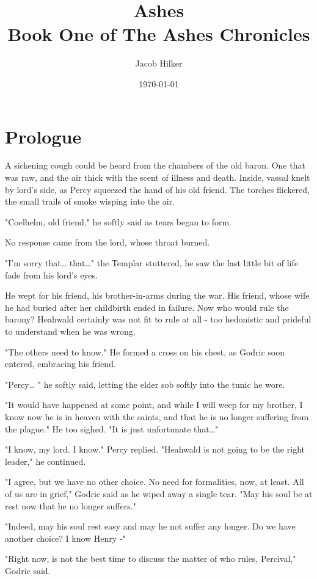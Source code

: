 \documentclass{book}
\author{Jacob Hilker}
\date{\today}
\title{Ashes\\\medskip
\large Book One of The Ashes Chronicles}
\begin{document}
\maketitle
\tableofcontents

\chapter*{Prologue}
\label{sec:org91c2b69}
A sickening cough could be heard from the chambers of the old baron. One that was raw, and the air thick with the scent of illness and death. Inside, vassal knelt by lord's side, as Percy squeezed the hand of his old friend. The torches flickered, the small trails of smoke wisping into the air.

"Coelhelm, old friend," he softly said as tears began to form.

No response came from the lord, whose throat burned.

"I'm sorry that… that…" the Templar stuttered, he saw the last little bit of life fade from his lord's eyes.

He wept for his friend, his brother-in-arms during the war. His friend, whose wife he had buried after her childbirth ended in failure. Now who would rule the barony? Heahwald certainly was not fit to rule at all - too hedonistic and prideful to understand when he was wrong.

"The others need to know." He formed a cross on his chest, as Godric soon entered, embracing his friend.

"Percy\ldots{} " he softly said, letting the elder sob softly into the tunic he wore.

"It would have happened at some point, and while I will weep for my brother, I know now he is in heaven with the saints, and that he is no longer suffering from the plague." He too sighed. "It is just unfortunate that…"

"I know, my lord. I know." Percy replied. "Heahwald is not going to be the right leader," he continued.

"I agree, but we have no other choice. No need for formalities, now, at least. All of us are in grief," Godric said as he wiped away a single tear. "May his soul be at rest now that he no longer suffers."

"Indeed, may his soul rest easy and may he not suffer any longer. Do we have another choice? I know Henry -"

"Right now, is not the best time to discuss the matter of who rules, Percival," Godric said.
\end{document}
